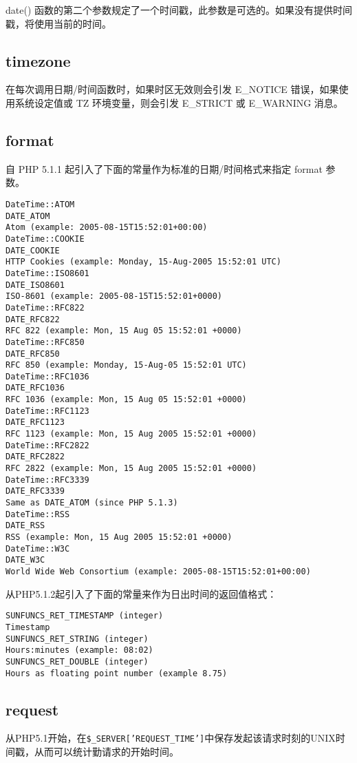 date() 函数的第二个参数规定了一个时间戳，此参数是可选的。如果没有提供时间戳，将使用当前的时间。

\subsection{timezone}


在每次调用日期/时间函数时，如果时区无效则会引发 E\_NOTICE 错误，如果使用系统设定值或 TZ 环境变量，则会引发 E\_STRICT 或 E\_WARNING 消息。


\subsection{format}


自 PHP 5.1.1 起引入了下面的常量作为标准的日期/时间格式来指定 format 参数。

\begin{verbatim}
DateTime::ATOM
DATE_ATOM
Atom (example: 2005-08-15T15:52:01+00:00)
DateTime::COOKIE
DATE_COOKIE
HTTP Cookies (example: Monday, 15-Aug-2005 15:52:01 UTC)
DateTime::ISO8601
DATE_ISO8601
ISO-8601 (example: 2005-08-15T15:52:01+0000)
DateTime::RFC822
DATE_RFC822
RFC 822 (example: Mon, 15 Aug 05 15:52:01 +0000)
DateTime::RFC850
DATE_RFC850
RFC 850 (example: Monday, 15-Aug-05 15:52:01 UTC)
DateTime::RFC1036
DATE_RFC1036
RFC 1036 (example: Mon, 15 Aug 05 15:52:01 +0000)
DateTime::RFC1123
DATE_RFC1123
RFC 1123 (example: Mon, 15 Aug 2005 15:52:01 +0000)
DateTime::RFC2822
DATE_RFC2822
RFC 2822 (example: Mon, 15 Aug 2005 15:52:01 +0000)
DateTime::RFC3339
DATE_RFC3339
Same as DATE_ATOM (since PHP 5.1.3)
DateTime::RSS
DATE_RSS
RSS (example: Mon, 15 Aug 2005 15:52:01 +0000)
DateTime::W3C
DATE_W3C
World Wide Web Consortium (example: 2005-08-15T15:52:01+00:00)
\end{verbatim}

从PHP5.1.2起引入了下面的常量来作为日出时间的返回值格式：

\begin{verbatim}
SUNFUNCS_RET_TIMESTAMP (integer)
Timestamp
SUNFUNCS_RET_STRING (integer)
Hours:minutes (example: 08:02)
SUNFUNCS_RET_DOUBLE (integer)
Hours as floating point number (example 8.75)
\end{verbatim}

\subsection{request}

从PHP5.1开始，在\texttt{\$\_SERVER['REQUEST\_TIME']}中保存发起该请求时刻的UNIX时间戳，从而可以统计勤请求的开始时间。


